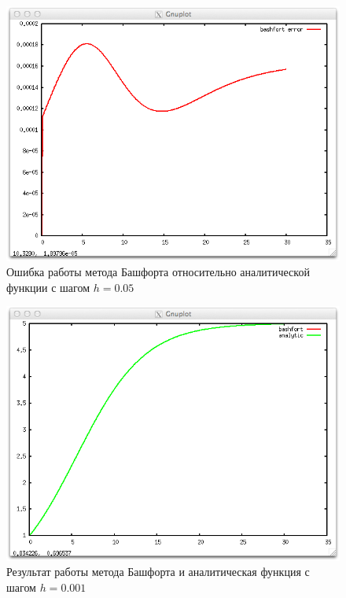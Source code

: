 \documentclass{article}
\begin{document}
  \begin{figure}
    \includegraphics[width=13cm]{bashfortError005.png}
    \caption{Ошибка работы метода Башфорта относительно аналитической функции с
    шагом $h=0.05$}
  \end{figure}
  
  \begin{figure}
    \includegraphics[width=13cm]{bashfortVSanalytic0001.png}
    \caption{Результат работы метода Башфорта и аналитическая функция с шагом
    $h=0.001$}
    \label{eulerVSanalytic}
  \end{figure}
  
\end{document}
